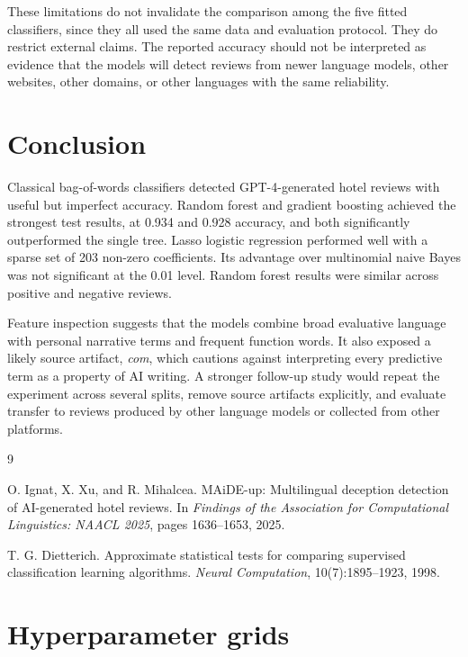 \documentclass[onecolumn]{jmlr}
\begin{document}
These limitations do not invalidate the comparison among the five fitted classifiers, since they all used the same data and evaluation protocol. They do restrict external claims. The reported accuracy should not be interpreted as evidence that the models will detect reviews from newer language models, other websites, other domains, or other languages with the same reliability.

\section{Conclusion}

Classical bag-of-words classifiers detected GPT-4-generated hotel reviews with useful but imperfect accuracy. Random forest and gradient boosting achieved the strongest test results, at 0.934 and 0.928 accuracy, and both significantly outperformed the single tree. Lasso logistic regression performed well with a sparse set of 203 non-zero coefficients. Its advantage over multinomial naive Bayes was not significant at the 0.01 level. Random forest results were similar across positive and negative reviews.

Feature inspection suggests that the models combine broad evaluative language with personal narrative terms and frequent function words. It also exposed a likely source artifact, \emph{com}, which cautions against interpreting every predictive term as a property of AI writing. A stronger follow-up study would repeat the experiment across several splits, remove source artifacts explicitly, and evaluate transfer to reviews produced by other language models or collected from other platforms.

\begin{thebibliography}{9}

O. Ignat, X. Xu, and R. Mihalcea.
\newblock MAiDE-up: Multilingual deception detection of AI-generated hotel reviews.
\newblock In \emph{Findings of the Association for Computational Linguistics: NAACL 2025}, pages 1636--1653, 2025.

T. G. Dietterich.
\newblock Approximate statistical tests for comparing supervised classification learning algorithms.
\newblock \emph{Neural Computation}, 10(7):1895--1923, 1998.

\end{thebibliography}

\appendix

\section{Hyperparameter grids}
\label{app:grids}
\end{document}
